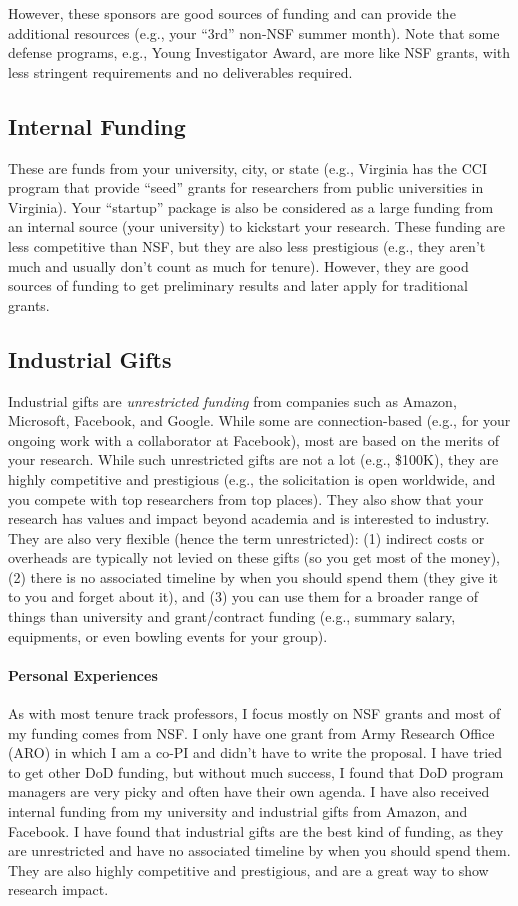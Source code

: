 \documentclass[oneside,11pt,dvipsnames]{book}
\begin{document}
However, these sponsors are good sources of funding and can provide the additional resources (e.g., your ``3rd'' non-NSF summer month). Note that some defense programs, e.g., Young Investigator Award, are more like NSF grants, with less stringent requirements and no deliverables required. 


\subsection{Internal Funding}\label{sec:internal}
These are funds from your university, city, or state (e.g., Virginia has the CCI program that provide ``seed'' grants for researchers from public universities in Virginia).  Your ``startup'' package is also be considered as a large funding from an internal source (your university) to kickstart your research. These funding are less competitive than NSF, but they are also less prestigious (e.g., they aren't much and usually don't count as much for tenure).  However, they are good sources of funding to get preliminary results and later apply for traditional grants.

\subsection{Industrial Gifts}
Industrial gifts are \emph{unrestricted funding} from companies such as Amazon, Microsoft, Facebook, and Google. While some are connection-based (e.g., for your ongoing work with a collaborator at Facebook), most are based on the merits of your research.
While such unrestricted gifts are not a lot (e.g., \$100K), they are highly competitive and prestigious (e.g., the solicitation is open worldwide, and you compete with top researchers from top places).  
They also show that your research has values and impact beyond academia and is interested to industry. 
They are also very flexible (hence the term unrestricted):  (1) indirect costs or overheads are typically not levied on these gifts (so you get most of the money), (2) there is no associated timeline by when you should spend them (they give it to you and forget about it), and (3) you can use them for a broader range of things than university and grant/contract funding (e.g., summary salary, equipments, or even bowling events for your group).

\paragraph{Personal Experiences}
As with most tenure track professors, I focus mostly on NSF grants and most of my funding comes from NSF.  I only have one grant from Army Research Office (ARO) in which I am a co-PI and didn't have to write the proposal. I have tried to get other DoD funding, but without much success, I found that DoD program managers are very picky and often have their own agenda.  I have also received internal funding from my university and industrial gifts from Amazon, and Facebook.  I have found that industrial gifts are the best kind of funding, as they are unrestricted and have no associated timeline by when you should spend them.  They are also highly competitive and prestigious, and are a great way to show research impact.
\end{document}
